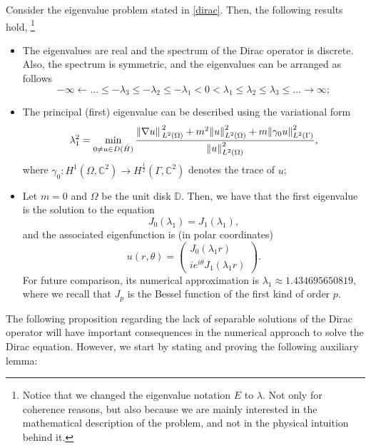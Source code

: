 \begin{proposition}\label{dirac_properties}
    Consider the eigenvalue problem stated in \eqref{dirac}. Then, the following results hold, \footnote{Notice that we changed the eigenvalue notation \(E\) to \(\lambda\). Not only for coherence reasons, but also because we are mainly interested in the mathematical description of the problem, and not in the physical intuition behind it.}
    \begin{itemize}
        \item The eigenvalues are real and the spectrum of the Dirac operator is discrete. Also, the spectrum is symmetric, and the eigenvalues can be arranged as follows
        \[
        -\infty \leftarrow \dots \leq -\lambda_3 \leq -\lambda_2 \leq -\lambda_1 < 0 < \lambda_1 \leq \lambda_2 \leq \lambda_3 \leq \dots \rightarrow \infty;
        \]
        \item The principal (first) eigenvalue can be described using the variational form
        \[
        \lambda_1^2 = \min_{0 \neq u \in D(\hat{H})}\frac{\norm*{\nabla u}_{L^2(\Omega)}^2 + m^2 \norm{u}_{L^2(\Omega)}^2 + m \norm{\gamma_0 u}_{L^2(\Gamma)}^2}{\norm{u}_{L^2(\Omega)}^2},
        \]
        where \(\gamma_0: H^1(\Omega, \mathbb{C}^2) \rightarrow H^{\frac{1}{2}}(\Gamma, \mathbb{C}^2)\) denotes the trace of \(u\);
        \item Let \(m=0\) and \(\Omega\) be the unit disk \(\mathbb{D}\). Then, we have that the first eigenvalue is the solution to the equation
        \[
        J_0(\lambda_1) = J_1(\lambda_1),
        \]
        and the associated eigenfunction is (in polar coordinates)
        \[
        u(r, \theta) = \begin{pmatrix}
            J_0(\lambda_1 r)\\
            i e^{i \theta}J_1(\lambda_1 r)
        \end{pmatrix}.    
        \]
        For future comparison, its numerical approximation is \(\lambda_1 \approx 1.434695650819\), where we recall that \(J_p\) is the Bessel function of the first kind of order \(p\).
    \end{itemize}
\end{proposition}

The following proposition regarding the lack of separable solutions of the Dirac operator will have important consequences in the numerical approach to solve the Dirac equation. However, we start by stating and proving the following auxiliary lemma:

